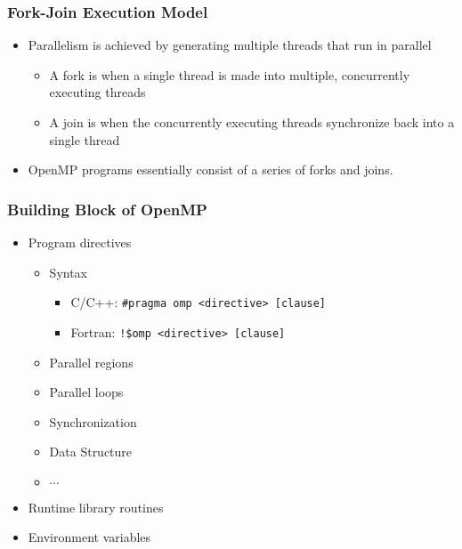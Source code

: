 \documentclass[10pt,t]{beamer}
\begin{document}
\begin{frame}
  \frametitle{Fork-Join Execution Model}
  \begin{block}{}
    \begin{itemize}
      \item Parallelism is achieved by generating multiple threads that run in parallel
      \begin{itemize}
        \item A fork  is when a single thread is made into multiple, concurrently executing threads
        \item A join  is when the concurrently executing threads synchronize back into a single thread
      \end{itemize}
      \item OpenMP programs essentially consist of a series of forks and joins.
    \end{itemize}
    \vspace{-0.8cm}
    
  \end{block}
\end{frame}

\begin{frame}
  \frametitle{Building Block of OpenMP}
  \begin{exampleblock}{}
    \begin{itemize}
      \item Program directives
        \begin{itemize}
          \item Syntax
            \begin{itemize}
              \item C/C++: \texttt{\#pragma omp <directive> [clause]}
              \item Fortran: \texttt{!\$omp <directive> [clause]}
            \end{itemize}
          \item Parallel regions
          \item Parallel loops
          \item Synchronization
          \item Data Structure
          \item $\cdots$
        \end{itemize}
      \item Runtime library routines
      \item Environment variables
    \end{itemize}
  \end{exampleblock}
\end{frame}
\end{document}
